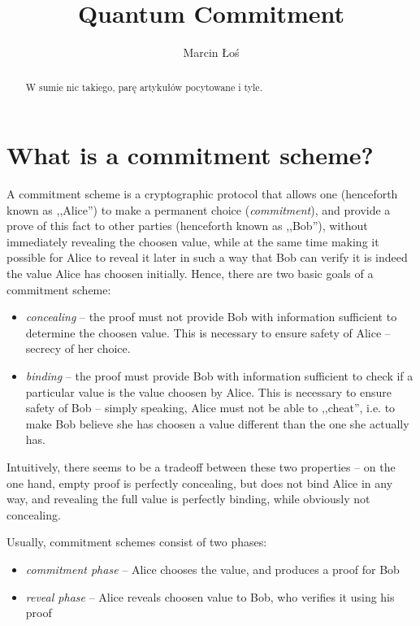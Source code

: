 \documentclass[10pt]{article}
\begin{document}
\begin{opening}

\title{Quantum Commitment}
\author[AGH University of Science and Technology, los@student.agh.edu.pl]{Marcin Łoś}

\begin{abstract}
  W sumie nic takiego, parę artykułów pocytowane i tyle.
\end{abstract}


\end{opening}

\section{What is a commitment scheme?} 

A commitment scheme is a cryptographic protocol that allows one (henceforth known as ,,Alice'') to make a
permanent choice (\emph{commitment}), and provide a prove of this fact to other parties (henceforth known
as ,,Bob''), without immediately revealing the choosen value, while at the same time making it possible 
for Alice to reveal it later in such a way that Bob can verify it is indeed the value Alice has choosen 
initially. Hence, there are two basic goals of a commitment scheme:

\begin{itemize}
  \item \emph{concealing} -- the proof must not provide Bob with information sufficient to determine the
    choosen value. This is necessary to ensure safety of Alice -- secrecy of her choice.
  \item \emph{binding} -- the proof must provide Bob with information sufficient to check if a particular
    value is the value choosen by Alice. This is necessary to ensure safety of Bob -- simply speaking,
    Alice must not be able to ,,cheat'', i.e. to make Bob believe she has choosen a value different than
    the one she actually has.
\end{itemize}

Intuitively, there seems to be a tradeoff between these two properties -- on the one hand, empty proof
is perfectly concealing, but does not bind Alice in any way, and revealing the full value is perfectly
binding, while obviously not concealing.


Usually, commitment schemes consist of two phases:

\begin{itemize}
  \item \emph{commitment phase} -- Alice chooses the value, and produces a proof for Bob
  \item \emph{reveal phase} -- Alice reveals choosen value to Bob, who verifies it using his proof
\end{itemize}
\end{document}

